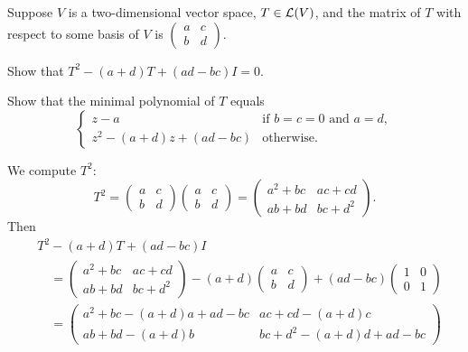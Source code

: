 \begin{exc}
\begin{exercise}
Suppose $V$ is a two-dimensional vector space, $T\in\mathcal{L}(V)$, and the matrix
of $T$ with respect to some basis of $V$ is
$\begin{pmatrix} a & c\\ b & d \end{pmatrix}$.
\begin{parts}
\item Show that $T^2-(a+d)T+(ad-bc)I=0$.
\item Show that the minimal polynomial of $T$ equals
  \[ \begin{cases} z-a & \text{if } b=c=0 \text{ and } a=d,\\
     z^2-(a+d)z+(ad-bc) & \text{otherwise}. \end{cases} \]
\end{parts}
\end{exercise}
\begin{solution}\leavevmode
\begin{parts}
\item We compute $T^2$:
  \[ T^2=\begin{pmatrix} a & c\\ b & d \end{pmatrix}
         \begin{pmatrix} a & c\\ b & d \end{pmatrix}
        =\begin{pmatrix} a^2+bc & ac+cd\\ ab+bd & bc+d^2 \end{pmatrix}. \]
  Then
  \begin{align*}
  &T^2-(a+d)T+(ad-bc)I\\
  &\quad=\begin{pmatrix} a^2+bc & ac+cd\\ ab+bd & bc+d^2 \end{pmatrix}
     -(a+d)\begin{pmatrix} a & c\\ b & d \end{pmatrix}
     +(ad-bc)\begin{pmatrix} 1 & 0\\ 0 & 1 \end{pmatrix}\\
  &\quad=\begin{pmatrix} a^2+bc-(a+d)a+ad-bc & ac+cd-(a+d)c\\
     ab+bd-(a+d)b & bc+d^2-(a+d)d+ad-bc \end{pmatrix}\\

\end{align*}
\end{parts}
\end{solution}
\end{exc}
